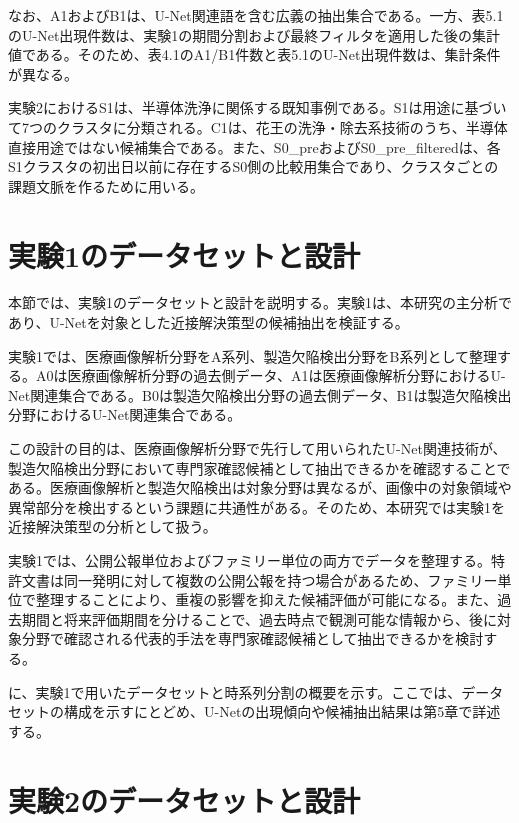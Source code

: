 なお、A1およびB1は、U-Net関連語を含む広義の抽出集合である。一方、表5.1のU-Net出現件数は、実験1の期間分割および最終フィルタを適用した後の集計値である。そのため、表4.1のA1/B1件数と表5.1のU-Net出現件数は、集計条件が異なる。

実験2におけるS1は、半導体洗浄に関係する既知事例である。S1は用途に基づいて7つのクラスタに分類される。C1は、花王の洗浄・除去系技術のうち、半導体直接用途ではない候補集合である。また、S0\_preおよびS0\_pre\_filteredは、各S1クラスタの初出日以前に存在するS0側の比較用集合であり、クラスタごとの課題文脈を作るために用いる。

\section{実験1のデータセットと設計}




本節では、実験1のデータセットと設計を説明する。実験1は、本研究の主分析であり、U-Netを対象とした近接解決策型の候補抽出を検証する。

実験1では、医療画像解析分野をA系列、製造欠陥検出分野をB系列として整理する。A0は医療画像解析分野の過去側データ、A1は医療画像解析分野におけるU-Net関連集合である。B0は製造欠陥検出分野の過去側データ、B1は製造欠陥検出分野におけるU-Net関連集合である。

この設計の目的は、医療画像解析分野で先行して用いられたU-Net関連技術が、製造欠陥検出分野において専門家確認候補として抽出できるかを確認することである。医療画像解析と製造欠陥検出は対象分野は異なるが、画像中の対象領域や異常部分を検出するという課題に共通性がある。そのため、本研究では実験1を近接解決策型の分析として扱う。

実験1では、公開公報単位およびファミリー単位の両方でデータを整理する。特許文書は同一発明に対して複数の公開公報を持つ場合があるため、ファミリー単位で整理することにより、重複の影響を抑えた候補評価が可能になる。また、過去期間と将来評価期間を分けることで、過去時点で観測可能な情報から、後に対象分野で確認される代表的手法を専門家確認候補として抽出できるかを検討する。

に、実験1で用いたデータセットと時系列分割の概要を示す。ここでは、データセットの構成を示すにとどめ、U-Netの出現傾向や候補抽出結果は第5章で詳述する。

\section{実験2のデータセットと設計}

